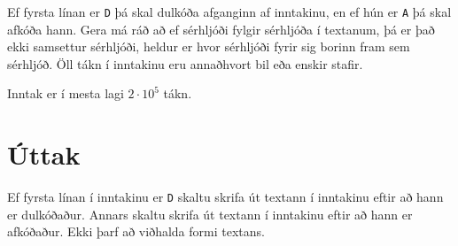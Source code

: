 Ef fyrsta línan er \texttt{D} þá skal dulkóða afganginn af inntakinu, en ef hún er \texttt{A} þá skal afkóða hann.
Gera má ráð að ef sérhljóði fylgir sérhljóða í textanum, þá er það ekki samsettur sérhljóði, heldur er hvor sérhljóði fyrir sig borinn fram sem sérhljóð.
Öll tákn í inntakinu eru annaðhvort bil eða enskir stafir.

Inntak er í mesta lagi $2 \cdot 10^5$ tákn.

\section*{Úttak}
Ef fyrsta línan í inntakinu er \texttt{D} skaltu skrifa út textann í inntakinu eftir að hann er dulkóðaður.
Annars skaltu skrifa út textann í inntakinu eftir að hann er afkóðaður.
Ekki þarf að viðhalda formi textans.
